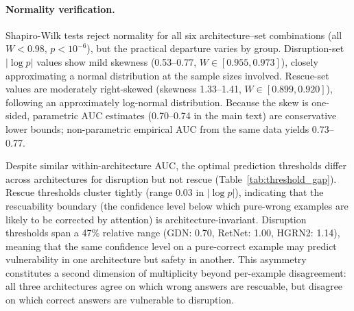\begin{table}[ht]
\centering
\small
\caption{Within-architecture prediction of attention effects on LAMBADA (1.3B). AUC$_p$: parametric (from Cohen's $d$); AUC$_e$: empirical (non-parametric).}
\label{tab:prediction_auc}
\end{table}

\paragraph{Normality verification.} Shapiro-Wilk tests reject normality for all six architecture--set combinations (all $W < 0.98$, $p < 10^{-6}$), but the practical departure varies by group. Disruption-set $|\log p|$ values show mild skewness (0.53--0.77, $W \in [0.955, 0.973]$), closely approximating a normal distribution at the sample sizes involved. Rescue-set values are moderately right-skewed (skewness 1.33--1.41, $W \in [0.899, 0.920]$), following an approximately log-normal distribution. Because the skew is one-sided, parametric AUC estimates (0.70--0.74 in the main text) are conservative lower bounds; non-parametric empirical AUC from the same data yields 0.73--0.77.

Despite similar within-architecture AUC, the optimal prediction thresholds differ across architectures for disruption but not rescue (Table~\ref{tab:threshold_gap}). Rescue thresholds cluster tightly (range 0.03 in $|\log p|$), indicating that the rescuability boundary (the confidence level below which pure-wrong examples are likely to be corrected by attention) is architecture-invariant. Disruption thresholds span a 47\% relative range (GDN: 0.70, RetNet: 1.00, HGRN2: 1.14), meaning that the same confidence level on a pure-correct example may predict vulnerability in one architecture but safety in another. This asymmetry constitutes a second dimension of multiplicity beyond per-example disagreement: all three architectures agree on which wrong answers are rescuable, but disagree on which correct answers are vulnerable to disruption.

